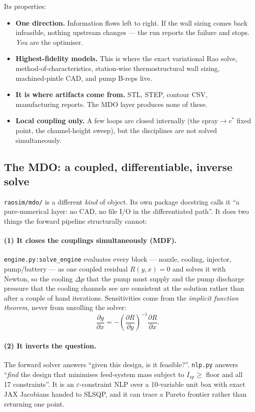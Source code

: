 \documentclass[11pt]{article}
\newcommand{\cmd}[1]{\nolinkurl{#1}}
\newcommand{\pd}[2]{\frac{\partial #1}{\partial #2}}
\begin{document}
Its properties:
\begin{itemize}[leftmargin=1.4em,itemsep=2pt]
\item \textbf{One direction.} Information flows left to right. If the wall
sizing comes back infeasible, nothing upstream changes --- the run reports
the failure and stops. \emph{You} are the optimiser.
\item \textbf{Highest-fidelity models.} This is where the exact variational
Rao solve, method-of-characteristics, station-wise thermostructural wall
sizing, machined-pintle CAD, and pump B-reps live.
\item \textbf{It is where artifacts come from.} STL, STEP, contour CSV,
manufacturing reports. The MDO layer produces none of these.
\item \textbf{Local coupling only.} A few loops are closed internally (the
spray$\to$$c^*$ fixed point, the channel-height sweep), but the disciplines
are not solved simultaneously.
\end{itemize}

\subsection{The MDO: a coupled, differentiable, inverse solve}

\cmd{raosim/mdo/} is a different \emph{kind} of object. Its own package
docstring calls it ``a pure-numerical layer: no CAD, no file I/O in the
differentiated path''. It does two things the forward pipeline structurally
cannot:

\paragraph{(1) It closes the couplings simultaneously (MDF).}
\cmd{engine.py:solve\_engine} evaluates every block --- nozzle, cooling,
injector, pump/battery --- as one coupled residual $R(y, x) = 0$ and solves
it with Newton, so the cooling $\Delta p$ that the pump must supply and the
pump discharge pressure that the cooling channels see are consistent at the
solution rather than after a couple of hand iterations. Sensitivities come
from the \emph{implicit function theorem}, never from unrolling the solver:
\begin{equation}
\pd{y}{x} = -\left(\pd{R}{y}\right)^{-1}\pd{R}{x}.
\end{equation}

\paragraph{(2) It inverts the question.}
The forward solver answers ``given this design, is it feasible?''.
\cmd{nlp.py} answers ``\emph{find} the design that minimises feed-system mass
subject to $I_{sp} \geq$ floor and all 17 constraints''. It is an
$\varepsilon$-constraint NLP over a 10-variable unit box with exact JAX
Jacobians handed to SLSQP, and it can trace a Pareto frontier rather than
returning one point.
\end{document}
